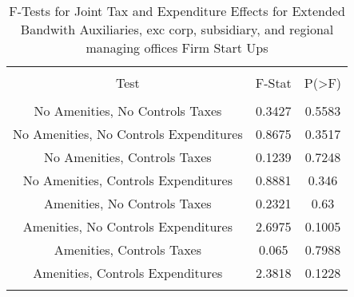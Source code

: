 
\begin{table}[!htbp] \centering 
  \caption{F-Tests for Joint Tax and Expenditure Effects for Extended Bandwith Auxiliaries, exc corp, subsidiary, and regional managing offices Firm Start Ups} 
  \label{95Ftests} 
\begin{tabular}{@{\extracolsep{5pt}} ccc} 
\\[-1.8ex]\hline 
\hline \\[-1.8ex] 
Test & F-Stat & P(\textgreater F) \\ 
\hline \\[-1.8ex] 
No Amenities, No Controls Taxes & 0.3427 & 0.5583 \\ 
No Amenities, No Controls Expenditures & 0.8675 & 0.3517 \\ 
No Amenities, Controls Taxes & 0.1239 & 0.7248 \\ 
No Amenities, Controls Expenditures & 0.8881 & 0.346 \\ 
Amenities, No Controls Taxes & 0.2321 & 0.63 \\ 
Amenities, No Controls Expenditures & 2.6975 & 0.1005 \\ 
Amenities, Controls Taxes & 0.065 & 0.7988 \\ 
Amenities, Controls Expenditures & 2.3818 & 0.1228 \\ 
\hline \\[-1.8ex] 
\end{tabular} 
\end{table} 
